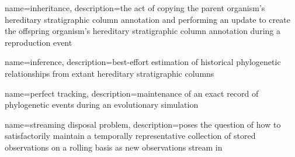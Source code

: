 {
    name=inheritance,
    description={the act of copying the parent organism's hereditary stratigraphic column annotation and performing an update to create the offspring organism's hereditary stratigraphic column annotation during a reproduction event}
}

{
    name=inference,
    description={best-effort estimation of historical phylogenetic relationships from extant hereditary stratigraphic columns}
}

{
    name=perfect tracking,
    description={maintenance of an exact record of phylogenetic events during an evolutionary simulation}
}

{
    name=streaming disposal problem,
    description={poses the question of how to satisfactorily maintain a temporally representative collection of stored observations on a rolling basis as new observations stream in}
}
